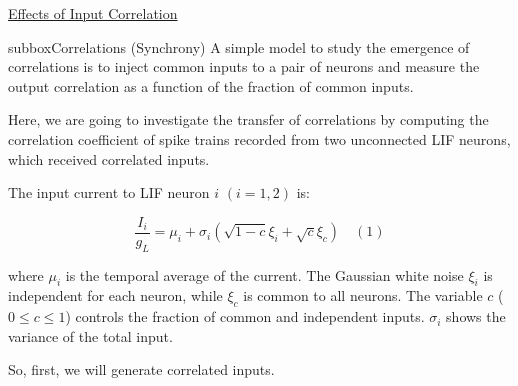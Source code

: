 \begin{textbox}{\href{https://compneuro.neuromatch.io/tutorials/W1D4_GeneralizedLinearModels/student/W1D4_Tutorial1.html}{Effects of Input Correlation } }
\begin{subbox}{subbox}{Correlations (Synchrony)}
A simple model to study the emergence of correlations is to inject common inputs to a pair of neurons and measure the output correlation as a function of the fraction of common inputs. 

Here, we are going to investigate the transfer of correlations by computing the correlation coefficient of spike trains recorded from two unconnected LIF neurons, which received correlated inputs.


The input current to LIF neuron $i$ $(i=1,2)$ is:

\begin{equation}
\frac{I_i}{g_L} =\mu_i + \sigma_i (\sqrt{1-c}\xi_i + \sqrt{c}\xi_c) \quad (1)
\end{equation}

where $\mu_i$ is the temporal average of the current. The Gaussian white noise $\xi_i$ is independent for each neuron, while $\xi_c$ is common to all neurons. The variable $c$ ($0\le c\le1$) controls the fraction of common and independent inputs. $\sigma_i$ shows the variance of the total input.

So, first, we will generate correlated inputs.

\end{subbox}

\end{textbox}
